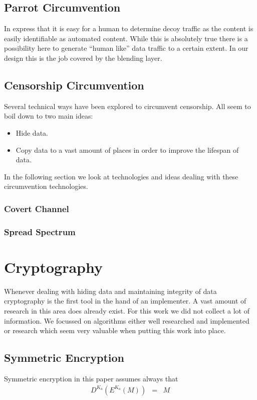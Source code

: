 \subsection{Parrot Circumvention}
In \cite{oakland2013-parrot} \citeauthor{oakland2013-parrot} express that it is easy for a human to determine decoy traffic as the content is easily identifiable as automated content. While this is absolutely true there is a possibility here to generate ``human like'' data traffic to a certain extent. In our design this is the job covered by the blending layer.

\subsection{Censorship Circumvention}
Several technical ways have been explored to circumvent censorship. All seem to boil down to two main ideas:
\begin{itemize}
	\item Hide data.
	\item Copy data to a vast amount of places in order to improve the lifespan of data.
\end{itemize}

In the following section we look at technologies and ideas dealing with these circumvention technologies.

\subsubsection{Covert Channel}

\subsubsection{Spread Spectrum}

\section{Cryptography}
Whenever dealing with hiding data and maintaining integrity of data cryptography is the first tool in the hand of an implementer. A vast amount of research in this area does already exist. For this work we did not collect a lot of information. We focussed on algorithms either well researched and implemented or research which seem very valuable when putting this work into place. 

\subsection{Symmetric Encryption}
Symmetric encryption in this paper assumes always that
\begin{eqnarray}
	D^{K_a}\left(E^{K_a}\left(M\right)\right) & = & M
\end{eqnarray} 

